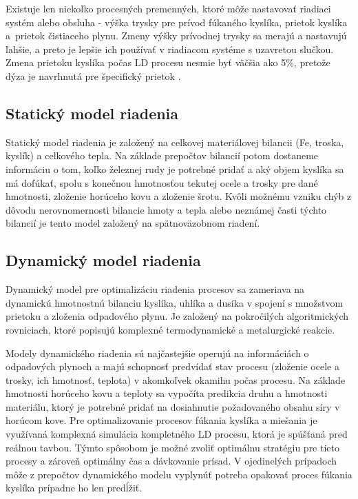 \documentclass[]{tukediphc}
\begin{document}
Existuje len niekoľko procesných premenných, ktoré môže nastavovať riadiaci systém alebo obsluha - výška trysky pre prívod fúkaného kyslíka, prietok kyslíka a~prietok čistiaceho plynu. Zmeny výšky prívodnej trysky sa merajú a nastavujú ľahšie, a preto je lepšie ich používať v riadiacom systéme s uzavretou slučkou. Zmena prietoku kyslíka počas LD procesu nesmie byť väčšia ako 5\%, pretože dýza je navrhnutá pre špecifický prietok \citep{Widlund1998}.

\subsection{Statický model riadenia}

Statický model riadenia je založený na celkovej materiálovej bilancii (Fe, troska, kyslík) a celkového tepla. Na základe prepočtov bilancií potom dostaneme informáciu o tom, koľko železnej rudy je potrebné pridať a aký objem kyslíka sa má dofúkať, spolu s konečnou hmotnosťou tekutej ocele a trosky pre dané hmotnosti, zloženie horúceho kovu a zloženie šrotu. Kvôli možnému vzniku chýb z dôvodu nerovnomernosti bilancie hmoty a tepla alebo neznámej časti týchto bilancií je tento model založený na spätnoväzobnom riadení.

\subsection{Dynamický model riadenia}

Dynamický model pre optimalizáciu riadenia procesov sa zameriava na dynamickú hmotnostnú bilanciu kyslíka, uhlíka a dusíka v spojení s množstvom prietoku a zloženia odpadového plynu. Je založený na pokročilých algoritmických rovniciach, ktoré popisujú komplexné termodynamické a metalurgické reakcie. 

Modely dynamického riadenia sú najčastejšie operujú na informáciách o odpadových plynoch a majú schopnosť predvídať stav procesu (zloženie ocele a trosky, ich hmotnosť, teplota) v akomkoľvek okamihu počas procesu. Na základe hmotnosti horúceho kovu a teploty sa vypočíta predikcia druhu a hmotnosti materiálu, ktorý je potrebné pridať na dosiahnutie požadovaného obsahu síry v horúcom kove. Pre optimalizovanie procesov fúkania kyslíka a miešania je využívaná komplexná simulácia kompletného LD procesu, ktorá je spúšťaná pred reálnou tavbou. Týmto spôsobom je možné zvoliť optimálnu stratégiu pre tieto procesy a zároveň optimálny čas a dávkovanie prísad. V ojedinelých prípadoch môže z prepočtov dynamického modelu vyplynúť potreba opakovať proces fúkania kyslíka prípadne ho len predĺžiť.
\end{document}

